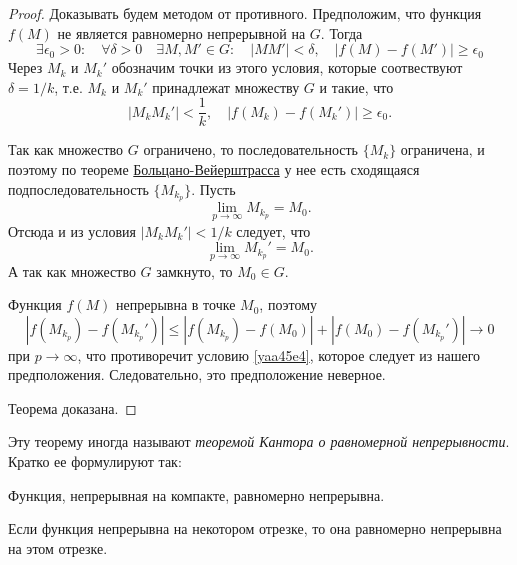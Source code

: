 \begin{proof}
Доказывать будем методом от противного. Предположим, что функция $f(M)$ не является равномерно непрерывной на $G$. Тогда
$$
\exists\epsilon_0>0:\quad\forall\delta>0\quad\exists M,M'\in G:\quad |MM'|<\delta, \quad |f(M)-f(M')|\ge \epsilon_0
$$
Через $M_k$ и $M_k'$ обозначим точки из этого условия, которые соотвествуют $\delta=1/k$, т.е. $M_k$ и $M_k'$ принадлежат множеству $G$ и такие, что 
\begin{equation}\label{yaa45e4}
|M_kM_k'|<\frac{1}{k},\quad|f(M_k)-f(M_k')|\ge \epsilon_0.
\end{equation}

Так как множество $G$ ограничено, то последовательность $\{M_k\}$ ограничена, и поэтому по теореме \hyperref[ch1.1thm3]{Больцано-Вейерштрасса} у нее есть сходящаяся подпоследовательность $\{M_{k_p}\}$. Пусть
$$
\lim\limits_{p\to\infty} M_{k_p} =M_0.
$$
Отсюда и из условия $|M_kM_k'|<1/k$ следует, что 
$$
\lim\limits_{p\to\infty} M_{k_p}' =M_0.
$$
А так как множество $G$ замкнуто, то $M_0 \in G$.

Функция $f(M)$ непрерывна в точке $M_0$, поэтому
$$
|f(M_{k_p})-f(M_{k_p}')|\le |f(M_{k_p})-f(M_0)|+|f(M_0)-f(M_{k_p}')|\to 0
$$
при $p\to\infty$, что противоречит условию \eqref{yaa45e4}, которое следует из нашего предположения. Следовательно, это предположение неверное. 

Теорема доказана.
\end{proof}

Эту теорему иногда называют \textit{теоремой Кантора о равномерной непрерывности}. Кратко ее формулируют так:

\begin{thmn}
Функция, непрерывная на компакте, равномерно непрерывна.
\end{thmn}

\begin{cons}
Если функция непрерывна на некотором отрезке, то она равномерно непрерывна на этом отрезке. 
\end{cons}

















